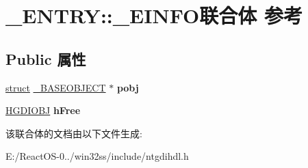 \hypertarget{union___e_n_t_r_y_1_1___e_i_n_f_o}{}\section{\+\_\+\+E\+N\+T\+RY\+:\+:\+\_\+\+E\+I\+N\+F\+O联合体 参考}
\label{union___e_n_t_r_y_1_1___e_i_n_f_o}
\subsection*{Public 属性}
\begin{DoxyCompactItemize}
\item 
\mbox{\label{union___e_n_t_r_y_1_1___e_i_n_f_o_a2803041cb697267b8deadfe4b2d82bab}} 
\hyperlink{interfacestruct}{struct} \hyperlink{struct___b_a_s_e_o_b_j_e_c_t}{\+\_\+\+B\+A\+S\+E\+O\+B\+J\+E\+CT} $\ast$ {\bfseries pobj}
\item 
\mbox{\label{union___e_n_t_r_y_1_1___e_i_n_f_o_a878b6bb63df14c48790d67f6afd93b1a}} 
\hyperlink{interfacevoid}{H\+G\+D\+I\+O\+BJ} {\bfseries h\+Free}
\end{DoxyCompactItemize}


该联合体的文档由以下文件生成\+:\begin{DoxyCompactItemize}
\item 
E\+:/\+React\+O\+S-\/0../win32ss/include/ntgdihdl.\+h\end{DoxyCompactItemize}
